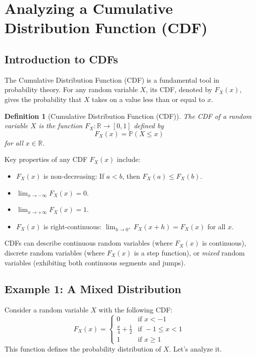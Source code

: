 \documentclass[11pt]{article}
\theoremstyle{mytheoremstyle}
\theoremstyle{mydefinitionstyle}
\newtheorem{definition}[theorem]{Definition}
\newcommand{\Prob}{\mathbb{P}} %
\begin{document}
\section{Analyzing a Cumulative Distribution Function (CDF)}

\subsection{Introduction to CDFs}

The Cumulative Distribution Function (CDF) is a fundamental tool in probability theory. For any random variable $X$, its CDF, denoted by $F_X(x)$, gives the probability that $X$ takes on a value less than or equal to $x$.

\begin{definition}[Cumulative Distribution Function (CDF)]
The CDF of a random variable $X$ is the function $F_X: \mathbb{R} \to [0, 1]$ defined by
\[ F_X(x) = \Prob(X \le x) \]
for all $x \in \mathbb{R}$.
\end{definition}

Key properties of any CDF $F_X(x)$ include:
\begin{itemize}
    \item $F_X(x)$ is non-decreasing: If $a < b$, then $F_X(a) \le F_X(b)$.
    \item $\lim_{x \to -\infty} F_X(x) = 0$.
    \item $\lim_{x \to +\infty} F_X(x) = 1$.
    \item $F_X(x)$ is right-continuous: $\lim_{h \to 0^+} F_X(x+h) = F_X(x)$ for all $x$.
\end{itemize}

CDFs can describe continuous random variables (where $F_X(x)$ is continuous), discrete random variables (where $F_X(x)$ is a step function), or \textit{mixed} random variables (exhibiting both continuous segments and jumps).

\subsection{Example 1: A Mixed Distribution}

Consider a random variable $X$ with the following CDF:
\[
F_X(x) = \begin{cases}
0 & \text{if } x < -1 \\
\frac{x}{4} + \frac{1}{2} & \text{if } -1 \le x < 1 \\
1 & \text{if } x \ge 1
\end{cases}
\]
This function defines the probability distribution of $X$. Let's analyze it.
\end{document}
